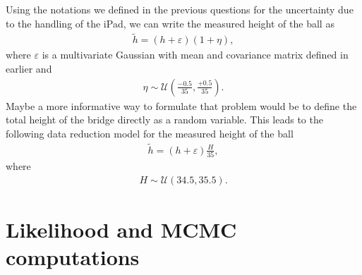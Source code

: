 \documentclass{article}
\begin{document}
\begin{enumerate}
Using the notations we defined in the previous questions for the
       uncertainty due to the handling of the iPad, we can write the
       measured height of the ball as 
\begin{align*}
 \tilde{h} = \left( h + \varepsilon \right) (1 + \eta),
\end{align*}
where $\varepsilon$ is a multivariate Gaussian with mean and covariance
       matrix defined in earlier and  
\begin{align*}
 \eta \sim \mathcal{U}\left( \frac{-0.5}{35}, \frac{+0.5}{35} \right) .
\end{align*}
Maybe a more informative way to formulate that problem would be to
       define the total height of the bridge directly as a random
       variable. This leads to the following data reduction model for
       the measured height of the ball 
\begin{align*}
 \tilde{h} = ( h  + \varepsilon ) \frac{H}{35},
\end{align*}
where
\begin{align*}
 H \sim \mathcal{U} \left( 34.5, 35.5 \right).
\end{align*}
\end{enumerate}


\section{Likelihood and MCMC computations}
\end{document}
